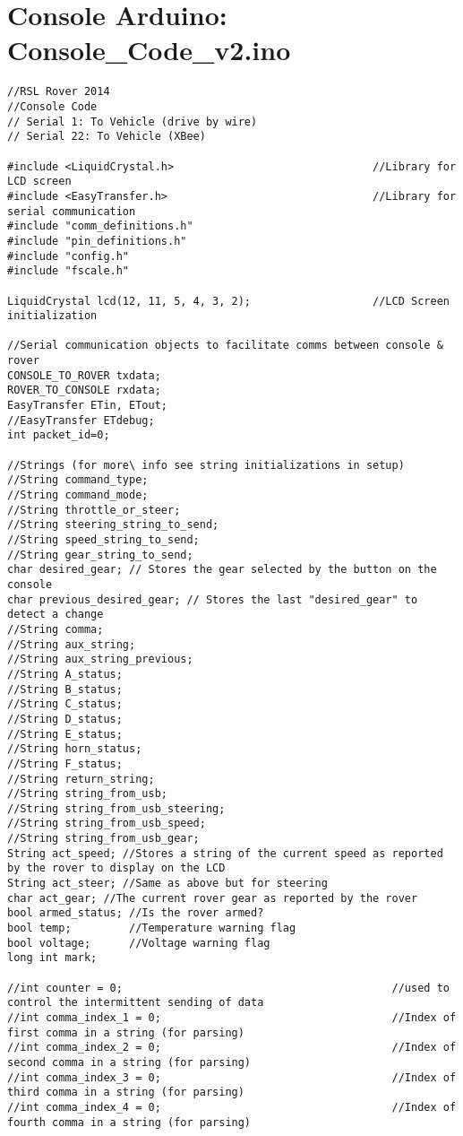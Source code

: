 \section*{Console Arduino: Console\_Code\_v2.ino}
\begin{lstlisting}[breaklines=true,basicstyle=\tiny]
//RSL Rover 2014
//Console Code
// Serial 1: To Vehicle (drive by wire) 
// Serial 22: To Vehicle (XBee)

#include <LiquidCrystal.h>                               //Library for LCD screen
#include <EasyTransfer.h>                                //Library for serial communication
#include "comm_definitions.h"
#include "pin_definitions.h"
#include "config.h"
#include "fscale.h"

LiquidCrystal lcd(12, 11, 5, 4, 3, 2);                   //LCD Screen initialization

//Serial communication objects to facilitate comms between console & rover
CONSOLE_TO_ROVER txdata;
ROVER_TO_CONSOLE rxdata;
EasyTransfer ETin, ETout;
//EasyTransfer ETdebug;
int packet_id=0;

//Strings (for more\ info see string initializations in setup)
//String command_type;   
//String command_mode;
//String throttle_or_steer;
//String steering_string_to_send;
//String speed_string_to_send;
//String gear_string_to_send;
char desired_gear; // Stores the gear selected by the button on the console
char previous_desired_gear; // Stores the last "desired_gear" to detect a change
//String comma;
//String aux_string;
//String aux_string_previous;
//String A_status;
//String B_status;
//String C_status;
//String D_status;
//String E_status;
//String horn_status;
//String F_status;
//String return_string;
//String string_from_usb;
//String string_from_usb_steering;
//String string_from_usb_speed;
//String string_from_usb_gear;
String act_speed; //Stores a string of the current speed as reported by the rover to display on the LCD
String act_steer; //Same as above but for steering
char act_gear; //The current rover gear as reported by the rover
bool armed_status; //Is the rover armed?
bool temp;         //Temperature warning flag
bool voltage;      //Voltage warning flag
long int mark;

//int counter = 0;                                          //used to control the intermittent sending of data
//int comma_index_1 = 0;                                    //Index of first comma in a string (for parsing)
//int comma_index_2 = 0;                                    //Index of second comma in a string (for parsing)
//int comma_index_3 = 0;                                    //Index of third comma in a string (for parsing)
//int comma_index_4 = 0;                                    //Index of fourth comma in a string (for parsing)


\end{lstlisting}
